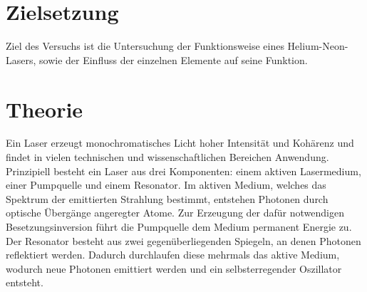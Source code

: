 



\maketitle

\section{Zielsetzung}
Ziel des Versuchs ist die Untersuchung der Funktionsweise eines Helium-Neon-Lasers, sowie der Einfluss 
der einzelnen Elemente auf seine Funktion.

\section{Theorie}
Ein Laser erzeugt monochromatisches Licht hoher Intensität und Kohärenz und findet in vielen technischen 
und wissenschaftlichen Bereichen Anwendung.
Prinzipiell besteht ein Laser aus drei Komponenten: einem aktiven Lasermedium, 
einer Pumpquelle und einem Resonator. 
Im aktiven Medium, welches das Spektrum der emittierten Strahlung bestimmt, 
entstehen Photonen durch optische Übergänge angeregter Atome. Zur Erzeugung der dafür notwendigen Besetzungsinversion 
führt die Pumpquelle dem Medium permanent Energie zu.
Der Resonator besteht aus zwei gegenüberliegenden Spiegeln, an denen Photonen reflektiert werden. Dadurch durchlaufen
diese mehrmals das aktive Medium, wodurch neue Photonen emittiert werden und ein selbsterregender Oszillator entsteht.


